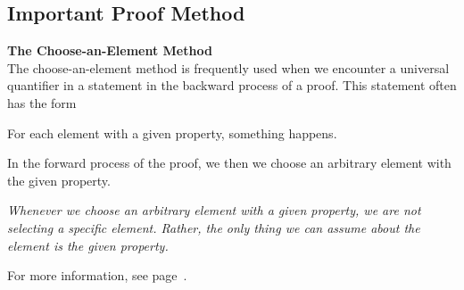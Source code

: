 \subsection*{Important Proof Method}

\noindent
\textbf{The Choose-an-Element Method} \hfill \\
%
The choose-an-element method is frequently used when we encounter a universal quantifier in a statement in the backward process of a proof.  This statement often has the form

\begin{center}
For each element with a given property, something happens.
\end{center}
In the forward process of the proof, we then we choose an arbitrary element with the given property.  
\vskip6pt
\begin{center}
\parbox{4in}{\emph{Whenever we choose an arbitrary element with a given property, we are not selecting a specific element.  Rather, the only thing we can assume about the element is the given property.}}
\end{center}
For more information, see page~\pageref{SS:choosemethod}.
\hbreak

\endinput
